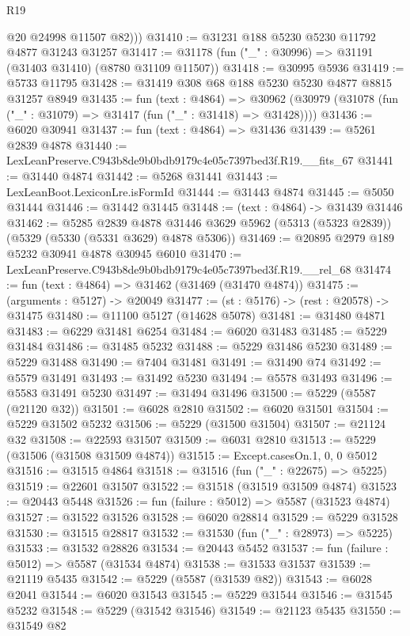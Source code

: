 \begin{lexlean}{R19}
\begin{coremodule}
          @20
          @24998
          @11507
          @82)))
@31410 := @31231 @188 @5230 @5230 @11792 @4877 @31243 @31257
@31417 := @31178 (fun ("_" : @30996) => @31191 (@31403 @31410) (@8780 @31109 @11507))
@31418 := @30995 @5936
@31419 := @5733 @11795
@31428 := @31419 @308 @68 @188 @5230 @5230 @4877 @8815 @31257 @8949
@31435 := fun (text : @4864) =>
  @30962 (@30979 (@31078 (fun ("_" : @31079) => @31417 (fun ("_" : @31418) => @31428))))
@31436 := @6020 @30941
@31437 := fun (text : @4864) => @31436
@31439 := @5261 @2839 @4878
@31440 := LexLeanPreserve.C943b8de9b0bdb9179c4e05c7397bed3f.R19.__fits_67
@31441 := @31440 @4874
@31442 := @5268 @31441
@31443 := LexLeanBoot.LexiconLre.isFormId
@31444 := @31443 @4874
@31445 := @5050 @31444
@31446 := @31442 @31445
@31448 := (text : @4864) -> @31439 @31446
@31462 := @5285
    @2839
    @4878
    @31446
    @3629
    @5962
    (@5313 (@5323 @2839))
    (@5329 (@5330 (@5331 @3629) @4878 @5306))
@31469 := @20895 @2979 @189 @5232 @30941 @4878 @30945 @6010
@31470 := LexLeanPreserve.C943b8de9b0bdb9179c4e05c7397bed3f.R19.__rel_68
@31474 := fun (text : @4864) => @31462 (@31469 (@31470 @4874))
@31475 := (arguments : @5127) -> @20049
@31477 := (st : @5176) -> (rest : @20578) -> @31475
@31480 := @11100 @5127 (@14628 @5078)
@31481 := @31480 @4871
@31483 := @6229 @31481 @6254
@31484 := @6020 @31483
@31485 := @5229 @31484
@31486 := @31485 @5232
@31488 := @5229 @31486 @5230
@31489 := @5229 @31488
@31490 := @7404 @31481
@31491 := @31490 @74
@31492 := @5579 @31491
@31493 := @31492 @5230
@31494 := @5578 @31493
@31496 := @5583 @31491 @5230
@31497 := @31494 @31496
@31500 := @5229 (@5587 (@21120 @32))
@31501 := @6028 @2810
@31502 := @6020 @31501
@31504 := @5229 @31502 @5232
@31506 := @5229 (@31500 @31504)
@31507 := @21124 @32
@31508 := @22593 @31507
@31509 := @6031 @2810
@31513 := @5229 (@31506 (@31508 @31509 @4874))
@31515 := Except.casesOn.{1, 0, 0} @5012
@31516 := @31515 @4864
@31518 := @31516 (fun ("_" : @22675) => @5225)
@31519 := @22601 @31507
@31522 := @31518 (@31519 @31509 @4874)
@31523 := @20443 @5448
@31526 := fun (failure : @5012) => @5587 (@31523 @4874)
@31527 := @31522 @31526
@31528 := @6020 @28814
@31529 := @5229 @31528
@31530 := @31515 @28817
@31532 := @31530 (fun ("_" : @28973) => @5225)
@31533 := @31532 @28826
@31534 := @20443 @5452
@31537 := fun (failure : @5012) => @5587 (@31534 @4874)
@31538 := @31533 @31537
@31539 := @21119 @5435
@31542 := @5229 (@5587 (@31539 @82))
@31543 := @6028 @2041
@31544 := @6020 @31543
@31545 := @5229 @31544
@31546 := @31545 @5232
@31548 := @5229 (@31542 @31546)
@31549 := @21123 @5435
@31550 := @31549 @82

\end{coremodule}
\end{lexlean}

